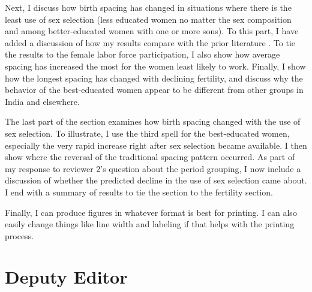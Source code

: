 \documentclass[letterpaper,12pt]{article}
\begin{document}
\begin{enumerate}
Next, I discuss how birth spacing has changed in situations where there is the least use
of sex selection (less educated women no matter the sex composition and among 
better-educated women with one or more sons).
To this part, I have added a discussion of how my results compare with the prior literature 
\citep{Rutstein2011,Casterline2016}.
To tie the results to the female labor force participation, I also show how average spacing
has increased the most for the women least likely to work.
Finally, I show how the longest spacing has changed with declining fertility, and discuss 
why the behavior of the best-educated women appear to be different from other groups in 
India and elsewhere.

The last part of the section examines how birth spacing changed with the use of sex selection.
To illustrate, I use the third spell for the best-educated women, especially the very 
rapid increase right after sex selection became available.
I then show where the reversal of the traditional spacing pattern occurred.
As part of my response to reviewer 2's question about the period grouping, I now include a 
discussion of whether the predicted decline in the use of sex selection came about.
I end with a summary of results to tie the section to the fertility section.

Finally, I can produce figures in whatever format is best for printing.
I can also easily change things like line width and labeling if that helps with the
printing process.

\end{enumerate}


\section*{Deputy Editor}
\end{document}
